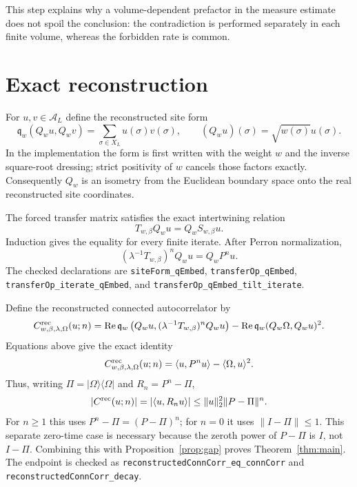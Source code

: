 \documentclass[11pt]{article}
\theoremstyle{definition}
\theoremstyle{remark}
\newcommand{\cA}{\mathcal{A}}
\newcommand{\lean}[1]{\nolinkurl{#1}}
\begin{document}
This step explains why a volume-dependent prefactor in the measure estimate
does not spoil the conclusion: the contradiction is performed separately in
each finite volume, whereas the forbidden rate is common.

\section{Exact reconstruction}
\label{sec:reconstruction}

For $u,v\in\cA_L$ define the reconstructed site form
\[
  \mathfrak q_w(Q_wu,Q_wv)=\sum_{\sigma\in X_L}u(\sigma)v(\sigma),
  \qquad (Q_wu)(\sigma)=\sqrt{w(\sigma)}u(\sigma).
\]
In the implementation the form is first written with the weight $w$ and the
inverse square-root dressing; strict positivity of $w$ cancels those factors
exactly.  Consequently $Q_w$ is an isometry from the Euclidean boundary space
onto the real reconstructed site coordinates.

The forced transfer matrix satisfies the exact intertwining relation
\begin{equation}
\label{eq:intertwining}
  T_{w,\beta}Q_wu=Q_wS_{w,\beta}u.
\end{equation}
Induction gives the equality for every finite iterate.  After Perron
normalization,
\[
  (\lambda^{-1}T_{w,\beta})^nQ_wu=Q_wP^nu.
\]
The checked declarations are \lean{siteForm\_qEmbed},
\lean{transferOp\_qEmbed}, \lean{transferOp\_iterate\_qEmbed}, and
\lean{transferOp\_qEmbed\_tilt\_iterate}.

Define the reconstructed connected autocorrelator by
\[
  C^{\rm rec}_{w,\beta,\lambda,\Omega}(u;n)
  =\operatorname{Re}\mathfrak q_w
     \left(Q_wu,(\lambda^{-1}T_{w,\beta})^nQ_wu\right)
   -\operatorname{Re}\mathfrak q_w(Q_w\Omega,Q_wu)^2.
\]
Equations above give the exact identity
\begin{equation}
\label{eq:corr-exact}
  C^{\rm rec}_{w,\beta,\lambda,\Omega}(u;n)
  =\langle u,P^nu\rangle-\langle\Omega,u\rangle^2.
\end{equation}
Thus, writing $\Pi=|\Omega\rangle\langle\Omega|$ and
$R_n=P^n-\Pi$,
\[
  |C^{\rm rec}(u;n)|=|\langle u,R_nu\rangle|
  \leq\|u\|_2^2\|P-\Pi\|^n.
\]
For $n\geq1$ this uses $P^n-\Pi=(P-\Pi)^n$; for $n=0$ it uses
$\|I-\Pi\|\leq1$.  This separate zero-time case is necessary because the
zeroth power of $P-\Pi$ is $I$, not $I-\Pi$.
Combining this with Proposition~\ref{prop:gap} proves
Theorem~\ref{thm:main}.  The endpoint is checked as
\lean{reconstructedConnCorr\_eq\_connCorr} and
\lean{reconstructedConnCorr\_decay}.
\end{document}
